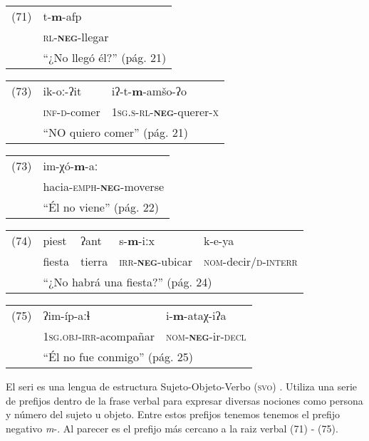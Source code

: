 {\setmainfont{Charis SIL} 

\begin{tabular}{ll}
(71) & t-\textbf{m}-afp \\
& \textsc{rl}-\textsc{\textbf{neg}}-llegar \\
& ``¿No llegó él?'' (pág. 21)
\end{tabular} \vspace{0.5cm}

\begin{tabular}{lll}
(73) & ik-oː-ʔit & iʔ-t-\textbf{m}-amšo-ʔo \\
& \textsc{inf-d}-comer & \textsc{1sg.s-rl-\textbf{neg}-}querer-\textsc{x} \\
& \multicolumn{2}{l}{``NO quiero comer'' (pág. 21)}
\end{tabular} \vspace{0.5cm}

\begin{tabular}{ll}
(73) & im-χó-\textbf{m}-aː \\
& hacia-\textsc{emph-\textbf{neg}}-moverse \\
& ``Él no viene'' (pág. 22)
\end{tabular} \vspace{0.5cm}

\begin{tabular}{lllll}
(74) & piest & ʔant & s-\textbf{m}-iːx & k-e-ya  \\
& fiesta & tierra & \textsc{irr-\textbf{neg}}-ubicar & \textsc{nom}-decir/\textsc{d-interr} \\
& \multicolumn{4}{l}{``¿No habrá una fiesta?'' (pág. 24)}
\end{tabular} \vspace{0.5cm}

\begin{tabular}{lll}
(75) & ʔim-íp-aːɬ & i-\textbf{m}-ataχ-iʔa \\
& \textsc{1sg.obj-irr}-acompañar & \textsc{nom-\textbf{neg}-}ir-\textsc{decl}\\
& \multicolumn{2}{l}{``Él no fue conmigo'' (pág. 25)}
\end{tabular} \vspace{0.5cm}

}

El seri es una lengua de estructura Sujeto-Objeto-Verbo (\textsc{svo}) \textcolor{MidnightBlue}{\citep{Seri}}. Utiliza una serie de prefijos dentro de la frase verbal para expresar diversas nociones como persona y número del sujeto u objeto. Entre estos prefijos tenemos tenemos el prefijo negativo {\setmainfont{Charis SIL} \textit{m}-}. Al parecer es el prefijo más cercano a la raiz verbal (71) - (75).